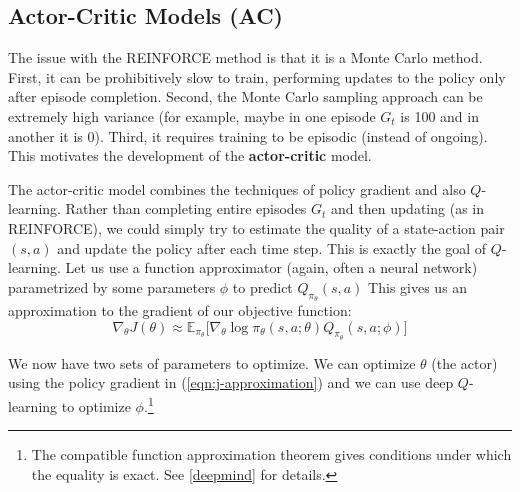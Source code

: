 \documentclass[journal, onecolumn, 12pt, draftclsnofoot]{IEEEtran}
\numberwithin{equation}{section}
\newcommand{\kword}[1]{\textbf{#1}}
\begin{document}
	\subsection{Actor-Critic Models (AC)}
	\par The issue with the REINFORCE method is that it is a Monte Carlo method. First, it can be prohibitively slow to train, performing updates to the policy only after episode completion. Second, the Monte Carlo sampling approach can be extremely high variance (for example, maybe in one episode $G_t$ is 100 and in another it is $0$). Third, it requires training to be episodic (instead of ongoing). This motivates the development of the \kword{actor-critic} model.
	\par The actor-critic model combines the techniques of policy gradient and also $Q$-learning. Rather than completing entire episodes $G_t$ and then updating (as in REINFORCE), we could simply try to estimate the quality of a state-action pair $(s,a)$ and update the policy after each time step. This is exactly the goal of $Q$-learning. Let us use a function approximator (again, often a neural network) parametrized by some parameters $\phi$ to predict $Q_{\pi_\theta}(s,a)$ This gives us an approximation to the gradient of our objective function:
	\begin{equation}
		\label{eqn:j-approximation}
		\nabla_\theta J(\theta) \approx \mathbb{E}_{\pi_\theta} \big[ \nabla_\theta \log \pi_\theta(s,a; \theta) Q_{\pi_\theta}(s,a; \phi) \big]
	\end{equation}
	\par We now have two sets of parameters to optimize. We can optimize $\theta$ (the actor) using the policy gradient in (\ref{eqn:j-approximation}) and we can use deep $Q$-learning to optimize $\phi$.\footnote{The compatible function approximation theorem gives conditions under which the equality is exact. See \ref{deepmind} for details.}
\end{document}
